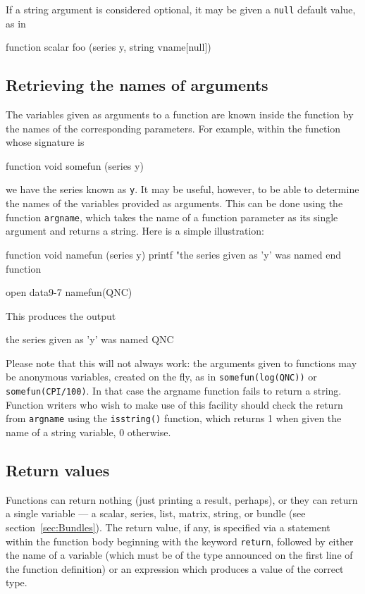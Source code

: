 If a string argument is considered optional, it may be given a
\texttt{null} default value, as in
%
\begin{code}
function scalar foo (series y, string vname[null])
\end{code}

\subsection{Retrieving the names of arguments}

The variables given as arguments to a function are known inside the
function by the names of the corresponding parameters.  For example,
within the function whose signature is
%
\begin{code}
function void somefun (series y)
\end{code}
%
we have the series known as \texttt{y}.  It may be useful, however, to
be able to determine the names of the variables provided as arguments.
This can be done using the function \texttt{argname}, which takes the
name of a function parameter as its single argument and returns a
string.  Here is a simple illustration:
%
\begin{code}
function void namefun (series y)
  printf "the series given as 'y' was named %
end function

open data9-7
namefun(QNC)
\end{code}
%
This produces the output
%
\begin{code}
the series given as 'y' was named QNC
\end{code}

Please note that this will not always work: the arguments given
to functions may be anonymous variables, created on the fly, as in
\texttt{somefun(log(QNC))} or \texttt{somefun(CPI/100)}.  In that case
the \textsf{argname} function fails to return a string.  Function
writers who wish to make use of this facility should check the return
from \texttt{argname} using the \texttt{isstring()} function, which
returns 1 when given the name of a string variable, 0 otherwise.

\subsection{Return values}

Functions can return nothing (just printing a result, perhaps), or
they can return a single variable --- a scalar, series, list, matrix,
string, or bundle (see section~\ref{sec:Bundles}).  The return value,
if any, is specified via a statement within the function body
beginning with the keyword \texttt{return}, followed by either the
name of a variable (which must be of the type announced on the first
line of the function definition) or an expression which produces a
value of the correct type.

